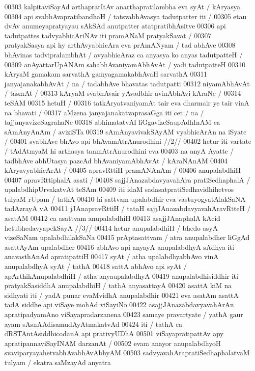 00303 kalpitaviSayAd arthapratItAv anarthapratilambha eva syAt / kAryasya
00304 api svabhAvapratibandhaH / tatsvabhAvasya tadutpatter iti /
00305 etau dvAv anumeyapratyayau sAkSAd anutpatter atatpratibhAsitve
00306 api tadutpattes tadvyabhicAriNAv iti pramANaM pratyakSavat /
00307 pratyakSasya api hy arthAvyabhicAra eva prAmANyam / tad abhAve 
00308 bhAvinas tadvipralambhAt / avyabhicAraz ca anyasya ko anyas tadutpatteH /
00309 anAyattarUpANAm sahabhAvaniyamAbhAvAt / yadi tadutpatteH 
00310 kAryaM gamakam sarvathA gamyagamakabhAvaH sarvathA
00311 janyajanakabhAvAt / na / tadabhAve bhavatas tadutpatti
00312 niyamAbhAvAt / tasmAt / 
00313 	kAryaM svabhAvair yAvadbhir avinAbhAvi kAraNe /
00314 teSAM  
00315 	hetuH / 
00316 tatkAryatvaniyamAt tair eva dharmair ye tair vinA na bhavati / 
00317 aMzena janyajanakatvaprasaGga iti cet / na / tajjanyavizeSagrahaNe
00318 abhimatatvAl liGgavizeSaupAdhInAM ca sAmAnyAnAm / aviziSTa  
00319 sAmAnyavivakSAyAM vyabhicArAn na iSyate / 
00401 	svabhAve bhAvo api bhAvamAtrAnurodhini //2//
00402 hetur iti vartate / tAdAtmyaM hi arthasya tanmAtrAnurodhini eva  
00403 na anyA Ayatte / tadbhAve abhUtasya pazcAd bhAvaniyamAbhAvAt / kAraNAnAM
00404 kAryavyabhicArAt / 
00405 	apravRttiH pramANAnAm /
00406 anupalabdhiH  
00407 	apravRttiphalA asati /  
00408 sajjJAnazabdavyavahAra pratiSedhaphalA / upalabdhipUrvakatvAt teSAm
00409 iti idaM sadasatpratiSedhavidhihetvos tulyaM rUpam / tathA 
00410 hi sattvam upalabdhir eva vastuyogyatAlakSaNA tadAzrayA vA  
00411 jJAnapravRttiH / tataH sajjJAnazabdavyavahAravRtteH / asatAM  
00412 ca asattvam anupalabdhiH  
00413 	asajjJAnaphalA kAcid hetubhedavyapekSayA //3//
00414 hetur anupalabdhiH / bhedo asyA vizeSaNam upalabdhilakSaNa 
00415 prAptasattvam / atra anupalabdher liGgAd asattAyAm upalabdher  
00416 abhAvo api anyayA anupalabdhyA sAdhya iti anavasthAnAd  apratipattiH
00417 syAt / atha upalabdhyabhAvo vinA anupalabdhyA syAt / tathA
00418 sattA abhAvo api syAt / apArthikAnupalabdhiH / atha anyaupalabdhyA
00419 anupalabdhisiddhir iti pratyakSasiddhA anupalabdhiH / tathA anyasattayA
00420 asattA kiM na sidhyati iti / yadA punar evaMvidhA anupalabdhir
00421 eva asatAm asattA tadA siddhe api viSaye mohAd viSayiNo
00422 asajjJAnazabdavyavahArAn apratipadyamAno viSayapradarzanena 
00423 samaye pravartyate / yathA gaur ayam sAsnAAdisamudAyAtmakatvAd 
00424 iti / tathA ca dRSTAntAsiddhicodanA api prativyUDhA
00501 viSayapratipattAv apy apratipannaviSayINAM darzanAt /
00502 evam anayor anupalabdhyoH svaviparyayahetvabhAvabhAvAbhyAM 
00503 sadvyavahArapratiSedhaphalatvaM tulyam / ekatra saMzayAd anyatra  

